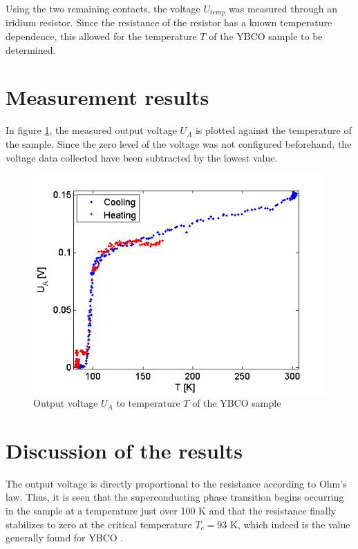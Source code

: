 \documentclass[12pt,a4paper]{article}
\begin{document}
Using the two remaining contacts, the voltage $U_{temp}$ was measured through an iridium resistor. Since the resistance of the resistor has a known temperature dependence, this allowed for the temperature $T$ of the YBCO sample to be determined.
\section{Measurement results}

In figure \ref{results}, the measured output voltage $U_A$ is plotted against the temperature of the sample. Since the zero level of the voltage was not configured beforehand, the voltage data collected have been subtracted by the lowest value.

\begin{figure}[ht!]
\centering
\includegraphics [scale=0.75]{results.png}
\caption{Output voltage $U_A$ to temperature $T$ of the YBCO sample}
\label{results}
\end{figure}

\section{Discussion of the results}

The output voltage is directly proportional to the resistance according to Ohm's law. Thus, it is seen that the superconducting phase transition begins occurring in the sample at a temperature just over 100 K and that the resistance finally stabilizes to zero at the critical temperature $T_c=93$ K, which indeed is the value generally found for YBCO \cite{YBCO}. \\
\end{document}
